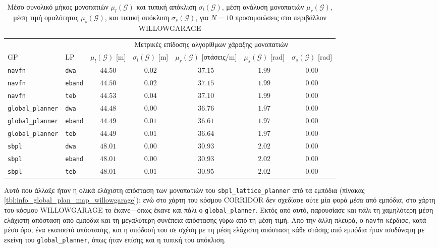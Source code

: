 \begin{table}[h]
\renewcommand{\arraystretch}{1.3}
\begin{tabular}{llccccc}
  & & \multicolumn{5}{c}{Μετρικές επίδοσης αλγορίθμων χάραξης μονοπατιών} \\
  \cline{3-7}
  GP & LP & $\mu_{l}(\bm{\mathcal{G}})$ [m] & $\sigma_{l}(\bm{\mathcal{G}})$ [m] & $\mu_r(\bm{\mathcal{G}})$ [στάσεις/m] & $\mu_{s}(\bm{\mathcal{G}})$ [rad] & $\sigma_{s}(\bm{\mathcal{G}})$ [rad] \\ \toprule
  \texttt{navfn} & \texttt{dwa} & $44.50$ & $0.02$ & $37.15$ & $1.99$ & $0.00$ \\
  \texttt{navfn} & \texttt{eband} & $44.50$ & $0.02$ & $37.15$ & $1.99$ & $0.00$ \\
  \texttt{navfn} & \texttt{teb} & $44.53$ & $0.04$ & $37.10$ & $1.99$ & $0.00$ \\
  \texttt{global\_planner} & \texttt{dwa} & $44.48$ & $0.00$ & $36.76$ & $1.97$ & $0.00$ \\
  \texttt{global\_planner} & \texttt{eband} & $44.49$ & $0.01$ & $36.61$ & $1.97$ & $0.00$ \\
  \texttt{global\_planner} & \texttt{teb} & $44.49$ & $0.01$ & $36.64$ & $1.97$ & $0.00$ \\
  \texttt{sbpl} & \texttt{dwa} & $48.01$ & $0.00$ & $30.93$ & $2.02$ & $0.00$ \\
  \texttt{sbpl} & \texttt{eband} & $48.01$ & $0.00$ & $30.93$ & $2.02$ & $0.00$ \\
  \texttt{sbpl} & \texttt{teb} & $48.01$ & $0.01$ & $30.95$ & $2.02$ & $0.00$ \\ \bottomrule
\end{tabular}
\caption{\small Μέσο συνολικό μήκος μονοπατιών $\mu_{l}(\bm{\mathcal{G}})$ και τυπική
         απόκλιση $\sigma_{l}(\bm{\mathcal{G}})$, μέση ανάλυση μονοπατιών
         $\mu_r(\bm{\mathcal{G}})$, μέση τιμή ομαλότητας
         $\mu_{s}(\bm{\mathcal{G}})$, και τυπική απόκλιση
         $\sigma_{s}(\bm{\mathcal{G}})$, για $N=10$ προσομοιώσεις στο περιβάλλον
         WILLOWGARAGE}
\label{tbl:info_global_plan_willowgarage}
\end{table}

Αυτό που άλλαξε ήταν η ολικά ελάχιστη απόσταση των μονοπατιών του
\texttt{sbpl\_lattice\_planner} από τα εμπόδια (πίνακας
\ref{tbl:info_global_plan_map_willowgarage}): ενώ στο χάρτη του κόσμου CORRIDOR
δεν σχεδίασε ούτε μία φορά \textit{μέσα} από εμπόδια, στο χάρτη του κόσμου
WILLOWGARAGE το έκανε---όπως έκανε και πάλι ο \texttt{global\_planner}. Εκτός
από αυτό, παρουσίασε και πάλι τη χαμηλότερη μέση ελάχιστη απόσταση από εμπόδια
και τη μεγαλύτερη συνέπεια απόστασης γύρω από τη μέση τιμή. Από την άλλη
πλευρά, ο \texttt{navfn} κέρδισε, κατά μέσο όρο, ένα εκατοστό απόστασης, και η
απόδοσή του σε σχέση με τη μέση ελάχιστη απόσταση κάθε στάσης από εμπόδια
ήταν ισοδύναμη με εκείνη του \texttt{global\_planner}, όπως ήταν επίσης και η
τυπική του απόκλιση.


